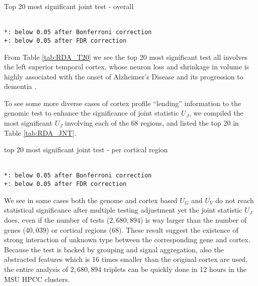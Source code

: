 \begin{table}[!htbp]
\centering
\small
\caption{Top 20 most significant joint test - overall}
\label{tab:RDA_T20}
 \\
\texttt{*: below 0.05 after Bonferroni correction} \\
\texttt{+: below 0.05 after FDR correction}
\end{table}
From Table \ref{tab:RDA_T20} we see the top 20 most significant test all involves the left superior temporal cortex, whose neuron loss and shrinkage in volume is highly associated with the onset of Alzheimer's Disease and its progression to dementia \cite{AD:ST1}. 

To see some more diverse cases of cortex profile ``lending'' information to the genomic test to enhance the significance of joint statistic $U_J$, we compiled the most significant $U_J$ involving each of the 68 regions, and listed the top 20 in Table \ref{tab:RDA_JNT}.
\begin{table}[!htbp]
\centering
\small
\caption{top 20 most significant joint test - per cortical region}
\label{tab:RDA_JNT}
 \\
\texttt{*: below 0.05 after Bonferroni correction} \\
\texttt{+: below 0.05 after FDR correction}
\end{table}
We see in some cases both the genome and cortex based $U_G$ and $U_V$ do not reach statistical significance after multiple testing adjustment yet the joint statistic $U_J$ does, even if the number of tests ($2,680,894$) is way larger than the number of genes ($40,039$) or cortical regions ($68$). These result suggest the existence of strong interaction of unknown type between the corresponding gene and cortex. Because the test is backed by grouping and signal aggregation, also the abstracted features which is 16 times smaller than the original cortex are used, the entire analysis of $2,680,894$ triplets can be quickly done in 12 hours in the MSU HPCC clusters.